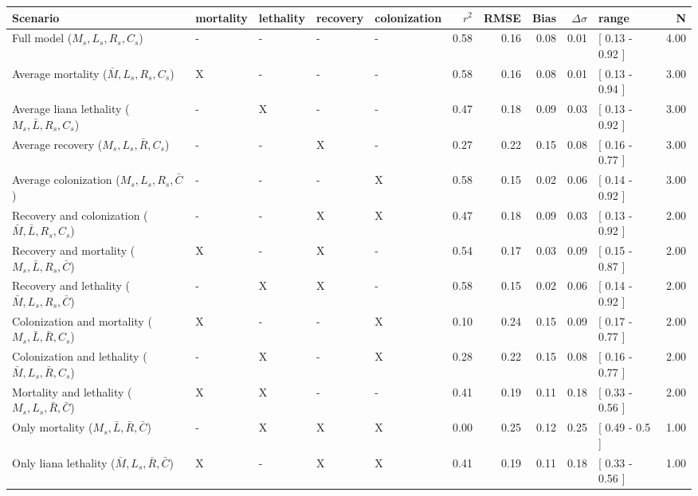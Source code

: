 \documentclass[b5paper,justified]{tufte-book} %
\begin{document}
\begin{fullwidth}
\begin{landscape}
\begin{table}
\begin{center}
\small
\hspace*{4cm}\begin{tabular}{lllllrrrrlr}
  \hline
Scenario & mortality & lethality & recovery & colonization & $r^2$ & RMSE & Bias & $\Delta\sigma$ & range & N \\ 
  \hline
Full model ($ M_s,L_s,R_s,C_s $) & - & - & - & - & 0.58 & 0.16 & 0.08 & 0.01 & [ 0.13 - 0.92 ] & 4.00 \\ 
  Average mortality ($ \bar{M},L_s,R_s,C_s $) & X & - & - & - & 0.58 & 0.16 & 0.08 & 0.01 & [ 0.13 - 0.94 ] & 3.00 \\ 
  Average liana lethality ($ M_s,\bar{L},R_s,C_s $) & - & X & - & - & 0.47 & 0.18 & 0.09 & 0.03 & [ 0.13 - 0.92 ] & 3.00 \\ 
  Average recovery ($ M_s,L_s,\bar{R},C_s $) & - & - & X & - & 0.27 & 0.22 & 0.15 & 0.08 & [ 0.16 - 0.77 ] & 3.00 \\ 
  Average colonization ($ M_s,L_s,R_s,\bar{C} $) & - & - & - & X & 0.58 & 0.15 & 0.02 & 0.06 & [ 0.14 - 0.92 ] & 3.00 \\ 
  Recovery and colonization ($ \bar{M},\bar{L},R_s,C_s $) & - & - & X & X & 0.47 & 0.18 & 0.09 & 0.03 & [ 0.13 - 0.92 ] & 2.00 \\ 
  Recovery and mortality ($ M_s,\bar{L},R_s,\bar{C} $) & X & - & X & - & 0.54 & 0.17 & 0.03 & 0.09 & [ 0.15 - 0.87 ] & 2.00 \\ 
  Recovery and lethality ($ \bar{M},L_s,R_s,\bar{C} $) & - & X & X & - & 0.58 & 0.15 & 0.02 & 0.06 & [ 0.14 - 0.92 ] & 2.00 \\ 
  Colonization and mortality ($ M_s,\bar{L},\bar{R},C_s $) & X & - & - & X & 0.10 & 0.24 & 0.15 & 0.09 & [ 0.17 - 0.77 ] & 2.00 \\ 
  Colonization and lethality ($ \bar{M},L_s,\bar{R},C_s $) & - & X & - & X & 0.28 & 0.22 & 0.15 & 0.08 & [ 0.16 - 0.77 ] & 2.00 \\ 
  Mortality and lethality ($ M_s,L_s,\bar{R},\bar{C} $) & X & X & - & - & 0.41 & 0.19 & 0.11 & 0.18 & [ 0.33 - 0.56 ] & 2.00 \\ 
  Only mortality ($ M_s,\bar{L},\bar{R},\bar{C} $) & - & X & X & X & 0.00 & 0.25 & 0.12 & 0.25 & [ 0.49 - 0.5 ] & 1.00 \\ 
  Only liana lethality ($ \bar{M},L_s,\bar{R},\bar{C} $) & X & - & X & X & 0.41 & 0.19 & 0.11 & 0.18 & [ 0.33 - 0.56 ] & 1.00 \\ 

\end{tabular}
\end{center}
\end{table}
\end{landscape}
\end{fullwidth}
\end{document}
